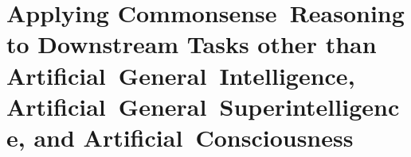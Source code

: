 \chapter{Applying Commonsense~Reasoning to Downstream Tasks other than Artificial~General~Intelligence, Artificial~General~Superintelligence, and Artificial~Consciousness}
